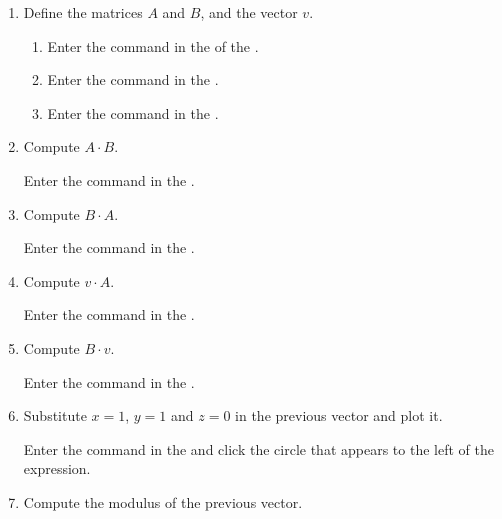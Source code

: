 \begin{enumerate}
      \begin{enumerate}
      \item Define the matrices $A$ and $B$, and the vector $v$.
            \begin{indication}
            \begin{enumerate}
            \item Enter the command  in the  of the .
            \item Enter the command  in the .
            \item Enter the command  in the .
            \end{enumerate}
            \end{indication}
      \item Compute $A\cdot B$.
            \begin{indication}
            Enter the command  in the .
            \end{indication}
      \item Compute $B\cdot A$.
            \begin{indication}
            Enter the command  in the .
            \end{indication}
      \item Compute $v\cdot A$.
            \begin{indication}
            Enter the command  in the .
            \end{indication}
      \item Compute $B\cdot v$.
            \begin{indication}
            Enter the command  in the .
            \end{indication}
      \item Substitute $x=1$, $y=1$ and $z=0$ in the previous vector and plot it.
            \begin{indication}
            Enter the command  in the  and click the circle that appears to the left of the expression.
            \end{indication}
      \item Compute the modulus of the previous vector.
            \begin{indication}

\end{indication}
\end{enumerate}
\end{enumerate}
